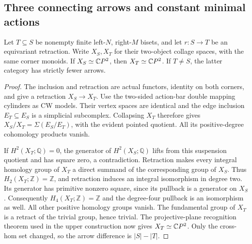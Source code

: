 \subsection{Three connecting arrows and constant minimal actions}

\begin{lemma}
\label{CP2:A-biset-retract}
Let $T\subseteq S$ be nonempty finite left-$N$, right-$M$ bisets,
and let $r:S\to T$ be an equivariant retraction. Write $X_S,X_T$
for their two-object collage spaces, with the same corner monoids.
If $X_S\simeq\mathbb{C}P^2$, then $X_T\simeq\mathbb{C}P^2$. If $T\ne S$,
the latter category has strictly fewer arrows.
\end{lemma}
\begin{proof}
The inclusion and retraction are actual functors, identity on both
corners, and give a retraction $X_S\to X_T$. Use the two-sided
action-bar double mapping cylinders as CW models. Their vertex
spaces are identical and the edge inclusion $E_T\subseteq E_S$
is a simplicial subcomplex. Collapsing $X_T$ therefore gives
$X_S/X_T=\Sigma(E_S/E_T)$, with the evident pointed quotient.
All its positive-degree cohomology products vanish.

If $H^2(X_T;\mathbb Q)=0$, the generator of $H^2(X_S;\mathbb Q)$
lifts from this suspension quotient and has square zero, a
contradiction. Retraction makes every integral homology group
of $X_T$ a direct summand of the corresponding group of $X_S$.
Thus $H_2(X_T;\mathbb Z)=\mathbb Z$, and retraction induces
an integral isomorphism in degree two. Its generator has
primitive nonzero square, since its pullback is a generator
on $X_S$. Consequently $H_4(X_T;\mathbb Z)=\mathbb Z$ and
the degree-four pullback is an isomorphism as well. All other
positive homology groups vanish. The fundamental group of
$X_T$ is a retract of the trivial group, hence trivial.
The projective-plane recognition theorem used in the upper
construction now gives $X_T\simeq\mathbb{C}P^2$. Only the cross-hom
set changed, so the arrow difference is $|S|-|T|$.
\end{proof}

